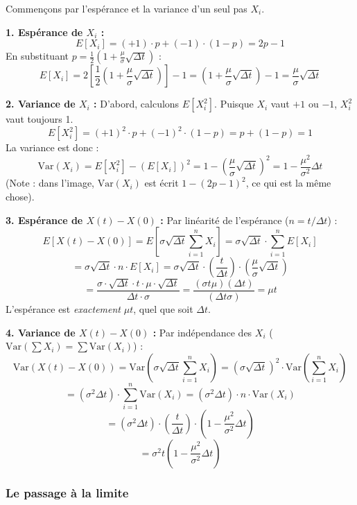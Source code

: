 \begin{examplebox}
Commençons par l'espérance et la variance d'un seul pas $X_i$.

\textbf{1. Espérance de $X_i$ :}
$$ E[X_i] = (+1) \cdot p + (-1) \cdot (1-p) = 2p - 1 $$
En substituant $p = \frac{1}{2} ( 1 + \frac{\mu}{\sigma} \sqrt{\Delta t} )$ :
$$ E[X_i] = 2 \left[ \frac{1}{2} \left( 1 + \frac{\mu}{\sigma} \sqrt{\Delta t} \right) \right] - 1 = \left( 1 + \frac{\mu}{\sigma} \sqrt{\Delta t} \right) - 1 = \frac{\mu}{\sigma} \sqrt{\Delta t} $$

\textbf{2. Variance de $X_i$ :}
D'abord, calculons $E[X_i^2]$. Puisque $X_i$ vaut $+1$ ou $-1$, $X_i^2$ vaut toujours 1.
$$ E[X_i^2] = (+1)^2 \cdot p + (-1)^2 \cdot (1-p) = p + (1-p) = 1 $$
La variance est donc :
$$ \text{Var}(X_i) = E[X_i^2] - (E[X_i])^2 = 1 - \left( \frac{\mu}{\sigma} \sqrt{\Delta t} \right)^2 = 1 - \frac{\mu^2}{\sigma^2} \Delta t $$
(Note : dans l'image, $\text{Var}(X_i)$ est écrit $1 - (2p-1)^2$, ce qui est la même chose).

\textbf{3. Espérance de $X(t) - X(0)$ :}
Par linéarité de l'espérance ($n = t/\Delta t$) :
$$ E[X(t) - X(0)] = E\left[ \sigma\sqrt{\Delta t} \sum_{i=1}^{n} X_i \right] = \sigma\sqrt{\Delta t} \cdot \sum_{i=1}^{n} E[X_i] $$
$$ = \sigma\sqrt{\Delta t} \cdot n \cdot E[X_i] = \sigma\sqrt{\Delta t} \cdot \left( \frac{t}{\Delta t} \right) \cdot \left( \frac{\mu}{\sigma} \sqrt{\Delta t} \right) $$
$$ = \frac{\sigma \cdot \sqrt{\Delta t} \cdot t \cdot \mu \cdot \sqrt{\Delta t}}{\Delta t \cdot \sigma} = \frac{(\sigma t \mu) (\Delta t)}{(\Delta t \sigma)} = \mu t $$
L'espérance est \textit{exactement} $\mu t$, quel que soit $\Delta t$.

\textbf{4. Variance de $X(t) - X(0)$ :}
Par indépendance des $X_i$ ($\text{Var}(\sum X_i) = \sum \text{Var}(X_i)$) :
$$ \text{Var}(X(t) - X(0)) = \text{Var}\left( \sigma\sqrt{\Delta t} \sum_{i=1}^{n} X_i \right) = (\sigma\sqrt{\Delta t})^2 \cdot \text{Var}\left( \sum_{i=1}^{n} X_i \right) $$
$$ = (\sigma^2 \Delta t) \cdot \sum_{i=1}^{n} \text{Var}(X_i) = (\sigma^2 \Delta t) \cdot n \cdot \text{Var}(X_i) $$
$$ = (\sigma^2 \Delta t) \cdot \left( \frac{t}{\Delta t} \right) \cdot \left( 1 - \frac{\mu^2}{\sigma^2} \Delta t \right) $$
$$ = \sigma^2 t \left( 1 - \frac{\mu^2}{\sigma^2} \Delta t \right) $$
\end{examplebox}

\subsubsection{Le passage à la limite}

